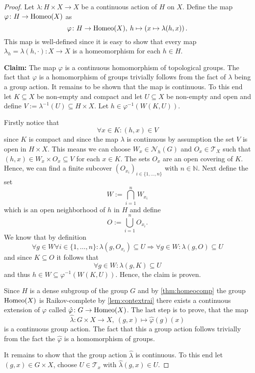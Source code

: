 \begin{proof}
  Let $\lambda\colon H\times X \to X$ be a continuous action of $H$ on $X$. Define the map $\varphi\colon H \to {\rm Homeo}(X)$ as $$ \varphi\colon H \to {\rm Homeo}(X), \: h \mapsto \left( x \mapsto \lambda(h, x) \right). $$ This map is well-defined since it is easy to show that every map $\lambda_h = \lambda(h, \cdot)\colon X\to X$ is a homeomorphism for each $h \in H$.

  \textbf{Claim:} The map $\varphi$ is a continuous homomorphism of topological groups.
  The fact that $\varphi$ is a homomorphism of groups trivially follows from the fact of $\lambda$ being a group action. It remains to be shown that the map is continuous. To this end let $K \subseteq X$ be non-empty and compact and let $U \subseteq X$ be non-empty and open and define $V := \lambda^{-1}(U) \subseteq H \times X$. Let $h \in \varphi^{-1}(W(K,U))$. 

  Firstly notice that $$ \forall x \in K\colon (h, x) \in V $$ since $K$ is compact and since the map $\lambda$ is continuous by assumption the set $V$ is open in $H \times X$. This means we can choose $W_x \in \mathcal{N}_h(G)$ and $O_x \in \mathcal{T}_X$ such that $(h, x) \in W_x \times O_x \subseteq V$ for each $x \in K$. The sets $O_x$ are an open covering of $K$. Hence, we can find a finite subcover $(O_{x_i})_{i\in \{1,\ldots,n\}}$ with $n \in \mathbb{N}$.   
  Next define the set $$W := \bigcap\limits_{i = 1}^n W_{x_i}$$ which is an open neighborhood of $h$ in $H$ and define $$ O := \bigcup\limits_{i=1}^n O_{x_i}.$$ We know that by definition $$ \forall g \in W\forall i \in \{1,\ldots,n\}\colon \lambda(g, O_{x_i}) \subseteq U \Rightarrow \forall g\in W:\lambda(g,O) \subseteq U$$ and since $K \subseteq O$ it follows that $$\forall g\in W\colon \lambda(g, K) \subseteq U$$ and thus $h \in W \subseteq \varphi^{-1}(W(K,U))$. Hence, the claim is proven.

  Since $H$ is a dense subgroup of the group $G$ and by \ref{thm:homeocomp} the group ${\rm Homeo}(X)$ is Raikov-complete by \ref{lem:contextrai} there exists a continuous extension of $\varphi$ called $\hat{\varphi}\colon G \to {\rm Homeo}(X)$. 
  The last step is to prove, that the map $$\hat{\lambda}\colon G \times X \to X, \: (g, x) \mapsto \hat{\varphi}(g)(x)$$ is a continuous group action.
  The fact that this a group action follows trivially from the fact the $\hat{\varphi}$ is a homomorphism of groups.

  It remains to show that the group action $\hat{\lambda}$ is continuous.
  To this end let $(g,x) \in G\times X$, choose $U \in \mathcal{T}_x$ with $\hat{\lambda}(g, x) \in U$.


\end{proof}
